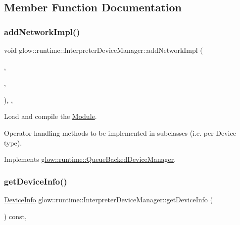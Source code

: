 \subsection{Member Function Documentation}
\mbox{\label{classglow_1_1runtime_1_1_interpreter_device_manager_acb6a52ac1d6b704796f52da6c26d2774}} 
\subsubsection{\texorpdfstring{add\+Network\+Impl()}{addNetworkImpl()}}
{\footnotesize\ttfamily void glow\+::runtime\+::\+Interpreter\+Device\+Manager\+::add\+Network\+Impl (\begin{DoxyParamCaption}\item[{const \hyperlink{classglow_1_1_module}{Module} $\ast$}]{,  }\item[{Function\+Map\+Ty}]{,  }\item[{Ready\+C\+B\+Ty}]{ }\end{DoxyParamCaption})\hspace{0.3cm}{\ttfamily [override]}, {\ttfamily [protected]}, {\ttfamily [virtual]}}



Load and compile the \hyperlink{classglow_1_1_module}{Module}. 

Operator handling methods to be implemented in subclasses (i.\+e. per Device type). 

Implements \hyperlink{classglow_1_1runtime_1_1_queue_backed_device_manager_a47a2b12e364f822961c904c7c123924a}{glow\+::runtime\+::\+Queue\+Backed\+Device\+Manager}.

\mbox{\label{classglow_1_1runtime_1_1_interpreter_device_manager_a02839dd04dcd6e6c3d768f39c666b67b}} 
\subsubsection{\texorpdfstring{get\+Device\+Info()}{getDeviceInfo()}}
{\footnotesize\ttfamily \hyperlink{structglow_1_1runtime_1_1_device_info}{Device\+Info} glow\+::runtime\+::\+Interpreter\+Device\+Manager\+::get\+Device\+Info (\begin{DoxyParamCaption}{ }\end{DoxyParamCaption}) const\hspace{0.3cm}{\ttfamily [override]}, {\ttfamily [virtual]}}

